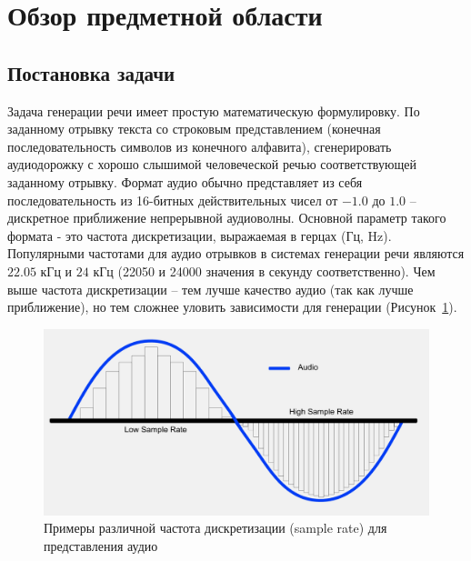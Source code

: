 \section{Обзор предметной области}

\subsection{Постановка задачи}

Задача генерации речи имеет простую математическую формулировку. По заданному отрывку текста со строковым представлением (конечная последовательность символов из конечного алфавита), сгенерировать аудиодорожку с хорошо слышимой человеческой речью соответствующей заданному отрывку. Формат аудио обычно представляет из себя последовательность из 16-битных действительных чисел от $-1.0$ до $1.0$ -- дискретное приближение непрерывной аудиоволны. Основной параметр такого формата - это частота дискретизации, выражаемая в герцах (Гц, Hz). Популярными частотами для аудио отрывков в системах генерации речи являются $22.05$ кГц и $24$ кГц (22050 и 24000 значения в секунду соответственно). Чем выше частота дискретизации -- тем лучше качество аудио (так как лучше приближение), но тем сложнее уловить зависимости для генерации (Рисунок~\ref{fig:sample-rate}).

\begin{figure}[!ht]
\centering
\includegraphics[width=1.0\textwidth]{images/sample-rate.png}
\caption{Примеры различной частота дискретизации (sample rate) для представления аудио}
\label{fig:sample-rate}
\end{figure}

